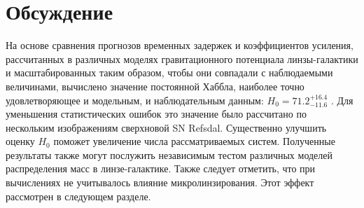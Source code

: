 \section{Обсуждение}

На основе сравнения прогнозов временных задержек и коэффициентов усиления, рассчитанных в различных моделях гравитационного потенциала линзы-галактики и масштабированных таким образом, чтобы они совпадали с наблюдаемыми величинами, вычислено значение постоянной Хаббла, наиболее точно удовлетворяющее и модельным, и наблюдательным данным: $H_0=71.2_ {-11.6}^{+16.4}$ . Для уменьшения статистических ошибок это значение было рассчитано по нескольким изображениям сверхновой SN Refsdal. Существенно улучшить оценку $H_0$ поможет увеличение числа рассматриваемых систем. Полученные результаты также могут послужить независимым тестом различных  моделей распределения масс в линзе-галактике. Также следует отметить, что при вычислениях не учитывалось влияние микролинзирования. Этот эффект рассмотрен в следующем разделе.

